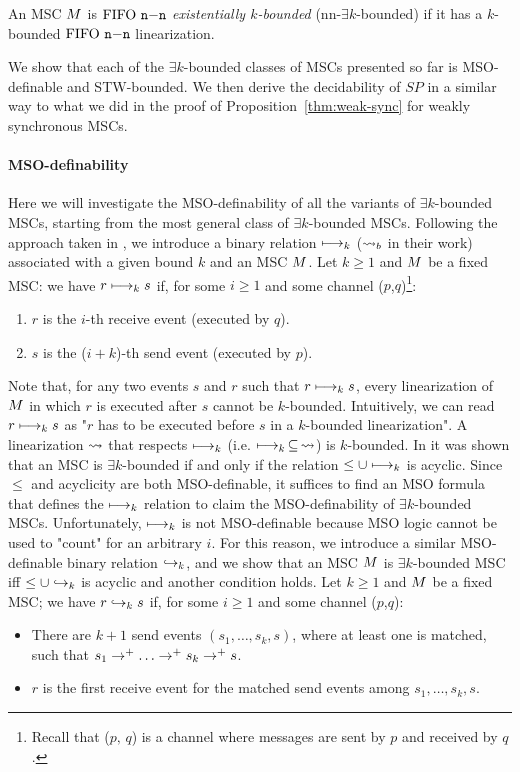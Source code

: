 \begin{definition}
	An MSC $M$ is \emph{$\text{FIFO } \mathtt{n\mathsf{-}n}$ existentially $k$-bounded} (nn-$\exists k$-bounded) if it has a $k$-bounded $\text{FIFO } \mathtt{n\mathsf{-}n}$ linearization.
\end{definition}

We show that each of the $\exists k$-bounded classes of MSCs presented so far is MSO-definable and STW-bounded. We then derive the decidability of $SP$ in a similar way to what we did in the proof of Proposition~\ref{thm:weak-sync} for weakly synchronous MSCs.

\paragraph*{MSO-definability}

Here we will investigate the MSO-definability of all the variants of $\exists k$-bounded MSCs, starting from the most general class of $\exists k$-bounded MSCs.
Following the approach taken in \cite{DBLP:conf/fossacs/LohreyM02}, we introduce a binary relation $\longmapsto_k$ ($\rightsquigarrow_b$ in their work) associated with a given bound $k$ and an MSC $M$. Let $k \ge 1$ and $M$ be a fixed MSC: we have $r \longmapsto_k s$ if, for some $i \ge 1$ and some channel ($p$,$q$)\footnote{Recall that ($p,\,q$) is a channel where messages are sent by $p$ and received by $q$.}:
\begin{enumerate}\itemsep=0.5ex
	\item $r$ is the $i$-th receive event (executed by $q$).
	\item $s$ is the ($i+k$)-th send event (executed by $p$).
\end{enumerate}
Note that, for any two events $s$ and $r$ such that $r \longmapsto_k s$, every linearization of $M$ in which $r$ is executed after $s$ cannot be $k$-bounded. Intuitively, we can read $r \longmapsto_k s$ as "$r$ has to be executed before $s$ in a $k$-bounded linearization". A linearization $\rightsquigarrow$ that respects $\longmapsto_k$ (i.e. $\longmapsto_k \,\subseteq\, \rightsquigarrow$) is $k$-bounded. In \cite{DBLP:conf/fossacs/LohreyM02} it was shown that an MSC is $\exists k$-bounded if and only if the relation $\le \cup \longmapsto_k$ is acyclic. Since $\le$ and acyclicity are both MSO-definable, it suffices to find an MSO formula that defines the $\longmapsto_k$ relation to claim the MSO-definability of $\exists k$-bounded MSCs. Unfortunately, $\longmapsto_k$ is not MSO-definable because MSO logic cannot be used to "count" for an arbitrary $i$. For this reason, we introduce a similar MSO-definable binary relation $\hookrightarrow_{k}$, and we show that an MSC $M$ is $\exists k$-bounded MSC iff $\le \cup \hookrightarrow_{k}$ is acyclic and another condition holds. Let $k \ge 1$ and $M$ be a fixed MSC; we have $r \hookrightarrow_{k} s$ if, for some $i \ge 1$ and some channel ($p$,$q$):
\begin{itemize}\itemsep=0.5ex
	\item There are $k+1$ send events $(s_1, \dots, s_k, s)$, where at least one is matched, such that $s_1 \procrel^+ \dots \procrel^+ s_k \procrel^+ s$.
 	\item $r$ is the first receive event for the matched send events among $s_1, \dots, s_k, s$.
\end{itemize}

